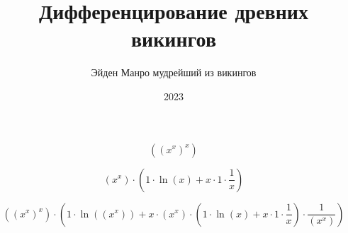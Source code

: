 \documentclass[a4paper,12pt]{article}
\title{\textbf{Дифференцирование древних викингов}}
\author{Эйден Манро мудрейший из викингов}
\date{2023}
\begin{document}
\maketitle


\begin{center}
\begin{equation}
((x^{x})^{x})
\end{equation}
\end{center}



\begin{center}
\begin{equation}
(x^{x}) \cdot (1 \cdot \ln(x) + x \cdot 1 \cdot  \frac{1 }{ x } )
\end{equation}
\end{center}



\begin{center}
\begin{equation}
((x^{x})^{x}) \cdot (1 \cdot \ln((x^{x})) + x \cdot (x^{x}) \cdot (1 \cdot \ln(x) + x \cdot 1 \cdot  \frac{1 }{ x } ) \cdot  \frac{1 }{ (x^{x}) } )
\end{equation}
\end{center}
\end{document}
